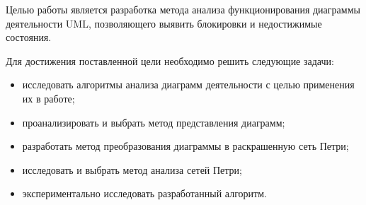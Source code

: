Целью работы является разработка метода анализа функционирования диаграммы деятельности UML, позволяющего выявить блокировки и недостижимые состояния.

Для достижения поставленной цели необходимо решить следующие задачи:
\begin{itemize}
\item исследовать алгоритмы анализа диаграмм деятельности с целью применения их в работе;
\item проанализировать и выбрать метод представления диаграмм;
\item разработать метод преобразования диаграммы в раскрашенную сеть Петри;
\item исследовать и выбрать метод анализа сетей Петри;
\item экспериментально исследовать разработанный алгоритм.
\end{itemize}

